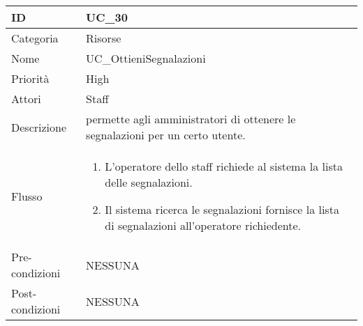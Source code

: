 \begin{center}
\begin{tabular}{ |p{2cm}|p{13cm}|  }
\hline
ID & UC\_30 \\\hline
Categoria & Risorse\\\hline
Nome & UC\_OttieniSegnalazioni\\\hline
Priorità & High \\\hline
Attori &  Staff \\\hline
Descrizione & permette agli amministratori di ottenere le segnalazioni per un certo utente.\\\hline
Flusso &  	\begin{enumerate}
			\item L'operatore dello staff richiede al sistema la lista delle segnalazioni.
			\item Il sistema ricerca le segnalazioni fornisce la lista di segnalazioni all'operatore richiedente.
			\end{enumerate}
			\\\hline
Pre-condizioni & NESSUNA\\\hline
Post-condizioni & NESSUNA\\\hline
\end{tabular}
\label{table_use_case:30}\newline


\end{center}
